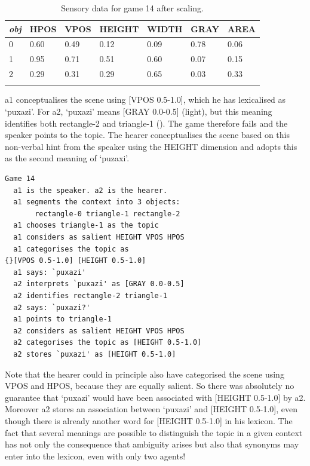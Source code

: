\begin{table}
\begin{center}
\begin{tabular}{ l  l  l  l  l  l  l }
\lsptoprule
{\itshape obj} & HPOS & VPOS & HEIGHT & WIDTH & GRAY & AREA \\ \midrule
0 & 0.60 & 0.49 & 0.12 & 0.09 & 0.78 & 0.06\\ 
1 & 0.95 & 0.71 & 0.51 & 0.60 & 0.07 & 0.15\\ 
2 & 0.29 & 0.31 & 0.29 & 0.65 & 0.03 & 0.33\\ 
\lspbottomrule
\end{tabular}
\caption{\label{tab:game14} Sensory data for game 14 after scaling.}
\end{center}
\end{table}

{\bfshape  a1} conceptualises the scene using 
{}[VPOS 0.5-1.0], which he has lexicalised as `puxazi'. 
For {\bfshape  a2}, `puxazi' means [GRAY 0.0-0.5] (light), but this 
meaning identifies both rectangle-2 and
triangle-1 (). The game therefore
fails and the speaker points to the topic. The hearer
conceptualises the scene based on this non-verbal
hint from the speaker using the HEIGHT dimension and adopts this as the second meaning 
of `puzaxi'. 
\begin{verbatim}
Game 14
  a1 is the speaker. a2 is the hearer. 
  a1 segments the context into 3 objects: 
       rectangle-0 triangle-1 rectangle-2
  a1 chooses triangle-1 as the topic 
  a1 considers as salient HEIGHT VPOS HPOS 
  a1 categorises the topic as 
{}[VPOS 0.5-1.0] [HEIGHT 0.5-1.0]
  a1 says: `puxazi'
  a2 interprets `puxazi' as [GRAY 0.0-0.5]
  a2 identifies rectangle-2 triangle-1
  a2 says: `puxazi?'
  a1 points to triangle-1
  a2 considers as salient HEIGHT VPOS HPOS 
  a2 categorises the topic as [HEIGHT 0.5-1.0]
  a2 stores `puxazi' as [HEIGHT 0.5-1.0]
\end{verbatim}
Note that the hearer could in principle 
also have categorised the
scene using VPOS and HPOS, because they are
equally salient. So there was absolutely no 
guarantee that `puxazi' would have been associated 
with [HEIGHT 0.5-1.0] by {\bfshape  a2}. Moreover {\bfshape  a2} stores
an association between `puxazi' and [HEIGHT 0.5-1.0], even though 
there is already another word for 
{}[HEIGHT 0.5-1.0] in his lexicon. The fact that 
several meanings are possible to distinguish the topic in a given 
context has not only the consequence that ambiguity
arises but also that synonyms may enter into the lexicon, 
even with only two agents!


